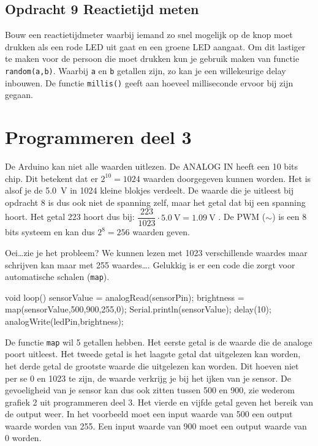 \documentclass{arduino}
\begin{document}
\subsection{Opdracht 9 Reactietijd meten}

Bouw een reactietijdmeter waarbij iemand zo snel mogelijk op de knop moet drukken als een rode LED uit gaat en een groene LED aangaat. Om dit lastiger te maken voor de persoon die moet drukken kun je gebruik maken van functie \lstinline{random(a,b)}. Waarbij \lstinline{a} en \lstinline{b} getallen zijn, zo kan je een willekeurige delay inbouwen. De functie \lstinline{millis()} geeft aan hoeveel milliseconde ervoor bij zijn gegaan.

\newpage

\section{Programmeren deel 3}


De Arduino kan niet alle waarden uitlezen. De ANALOG IN heeft een 10 bits chip. Dit betekent dat er $2^{10} = 1024$ waarden doorgegeven kunnen worden. Het is alsof je de \SI{5.0}{\volt} in 1024 kleine blokjes verdeelt. De waarde die je  uitleest bij opdracht 8 is dus ook niet de spanning zelf, maar het getal dat bij een spanning hoort. Het getal 223 hoort dus bij: $\dfrac{223}{1023} \cdot \SI{5.0}{\volt} = \SI{1.09}{\volt}$ . De PWM ($\sim$) is een 8 bits systeem en kan dus $2^8 = 256$ waarden geven.

Oei\dots zie je het probleem? We kunnen lezen met 1023 verschillende waardes maar schrijven kan maar met 255 waardes\dots. Gelukkig is er een code die zorgt voor automatische schalen (\lstinline{map}).

\begin{marginlisting}
void loop() {
  sensorValue = analogRead(sensorPin);
  brightness = map(sensorValue,500,900,255,0);
  Serial.println(sensorValue);
  delay(10);
  analogWrite(ledPin,brightness);
}
\end{marginlisting}
De functie \lstinline{map} wil 5 getallen hebben. Het eerste getal is de waarde die de analoge poort uitleest. Het tweede getal is het laagste getal dat uitgelezen kan worden, het derde getal de grootste waarde die uitgelezen kan worden. Dit hoeven niet per se 0 en 1023 te zijn, de waarde verkrijg je bij het ijken van je sensor. De gevoeligheid van je sensor kan dus ook zitten tussen 500 en 900, zie wederom grafiek 2 uit programmeren deel 3. Het vierde en vijfde getal geven het bereik van de output weer. In het voorbeeld moet een input waarde van 500 een output waarde worden van 255. Een input waarde van 900 moet een output waarde van 0 worden.
\end{document}
